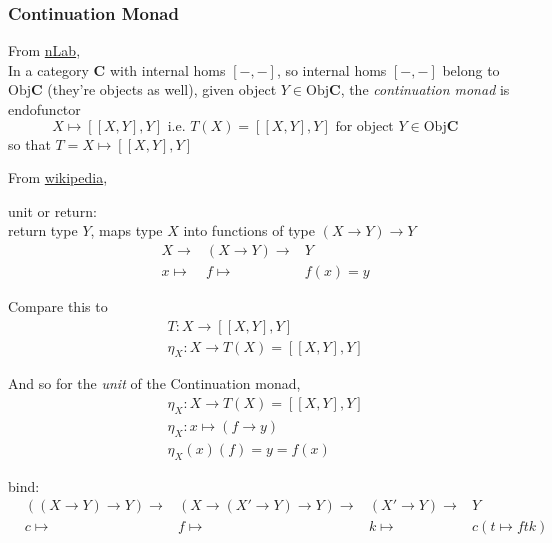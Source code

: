 \subsubsection{Continuation Monad}

From \href{https://ncatlab.org/nlab/show/continuation+monad}{nLab}, \\
In a category $\mathbf{C}$ with internal homs $[-, -]$, so internal homs $[-,-]$ belong to $\text{Obj}{\mathbf{C}}$ (they're objects as well), given object $Y \in \text{Obj}{\mathbf{C}}$, the \emph{continuation monad} is endofunctor
\begin{equation}
\boxed{ X \mapsto [[X, Y], Y] } \text{ i.e. } T(X) = [[X, Y], Y] \text{ for object $Y \in \text{Obj}{\mathbf{C}}$ } 
\end{equation}
so that $T = X\mapsto [[X, Y] , Y]$

From \href{https://en.wikipedia.org/wiki/Monad\_(functional\_programming)\#Continuation\_monad}{wikipedia},

unit or return:  \\

return type $Y$, maps type $X$ into functions of type $(X \to Y) \to Y$
\begin{equation} 
\begin{aligned}
	& X \to & (X\to Y) \to & Y \\
	& x\mapsto & f \mapsto & f(x) = y
\end{aligned}
\end{equation}

Compare this to
\begin{equation}
\begin{aligned}
& T : X \to [[X, Y], Y] \\ 
& \eta_X : X \to T(X) = [[X,Y], Y]
\end{aligned}
\end{equation}

And so for the \emph{unit} of the Continuation monad,
\begin{equation}
\boxed{
\begin{aligned}
& \eta_X : X \to T(X) = [[X, Y], Y] \\
& \eta_X : x\mapsto (f \to y) \\ 
& \eta_X(x)(f) = y = f(x)
\end{aligned}
}
\end{equation}

bind: \\

\begin{equation}\label{agat:Eq:ContinuationMonadBindWiki}
\begin{aligned}
& ((X\to Y) \to Y) \to & (X \to (X' \to Y) \to Y) \to & (X' \to Y) \to & Y \\
& c \mapsto & f \mapsto & k \mapsto &  c(t\mapsto ftk)
\end{aligned}
\end{equation}

